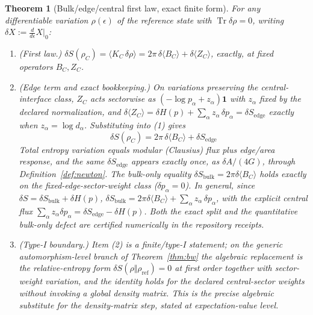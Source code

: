 \documentclass[11pt]{article}
\newtheorem{theorem}{Theorem}[section]
\begin{document}
\begin{theorem}[Bulk/edge/central first law, exact finite form]
\label{thm:bulk-edge-central-first-law}
For any differentiable variation \(\rho(\epsilon)\) of the reference state
with \(\operatorname{Tr}\delta\rho=0\), writing
\(\delta X:=\tfrac{d}{d\epsilon}X|_{0}\):
\begin{enumerate}[leftmargin=2em]
\item (\emph{First law.})
\(\delta S(\rho_C)=\langle K_C\,\delta\rho\rangle
=2\pi\,\delta\langle B_C\rangle+\delta\langle Z_C\rangle\),
exactly, at fixed operators \(B_C,Z_C\).
\item (\emph{Edge term and exact bookkeeping.}) On
variations preserving the central-interface class, \(Z_C\) acts sectorwise as
\((-\log p_\alpha+z_\alpha)\mathbf 1\) with \(z_\alpha\) fixed by the
declared normalization, and
\(\delta\langle Z_C\rangle=\delta H(p)+\sum_\alpha z_\alpha\,\delta p_\alpha
=\delta S_{\mathrm{edge}}\)
exactly when \(z_\alpha=\log d_\alpha\). Substituting into (1) gives
\[
\boxed{\;\delta S(\rho_C)
=2\pi\,\delta\langle B_C\rangle+\delta S_{\mathrm{edge}}\;}
\]
Total entropy variation equals modular (Clausius) flux plus edge/area response,
and the same \(\delta S_{\mathrm{edge}}\) appears
exactly once, as \(\delta A/(4G)\), through Definition~\ref{def:newton}. The
bulk-only equality \(\delta S_{\mathrm{bulk}}=2\pi\delta\langle B_C\rangle\)
holds exactly on the fixed-edge-sector-weight class
(\(\delta p_\alpha=0\)). In general, since
\(\delta S=\delta S_{\mathrm{bulk}}+\delta H(p)\),
\(\delta S_{\mathrm{bulk}}
=2\pi\delta\langle B_C\rangle+\sum_\alpha z_\alpha\,\delta p_\alpha\),
with the explicit central flux
\(\sum_\alpha z_\alpha\delta p_\alpha
=\delta S_{\mathrm{edge}}-\delta H(p)\). Both the exact split and the
quantitative bulk-only defect are certified numerically in the repository
receipts.
\item (\emph{Type-I boundary.}) Item (2) is a finite/type-I statement; on the
generic automorphism-level branch of Theorem~\ref{thm:bw} the algebraic
replacement is the relative-entropy form
\(\delta S(\rho\Vert\rho_{\mathrm{ref}})=0\) at first order together with
sector-weight variation, and the identity holds for the declared
central-sector weights without invoking a global density matrix. This is the
precise algebraic substitute for the density-matrix step, stated at
expectation-value level.
\end{enumerate}
\end{theorem}
\end{document}
